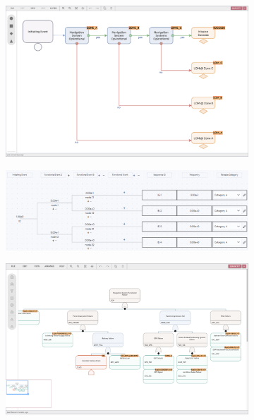 \begin{figure}[h!]
  \centering
  \begin{subfigure}[b]{0.48\textwidth}
    \centering
    \includegraphics[width=\textwidth]{4_proposed_solution/web_app/figures/esd.png}
    \caption{}
  \end{subfigure}
  \begin{subfigure}[b]{0.48\textwidth}
    \centering
    \includegraphics[width=\textwidth]{4_proposed_solution/web_app/figures/et.png}
    \caption{}
  \end{subfigure}
  \begin{subfigure}[b]{0.48\textwidth}
    \centering
    \includegraphics[width=\textwidth]{4_proposed_solution/web_app/figures/ft.png}

\end{subfigure}
\end{figure}
